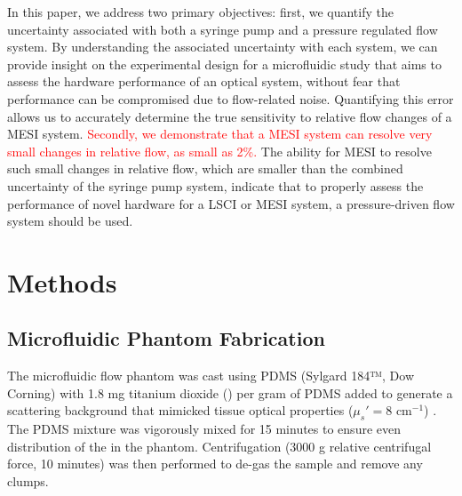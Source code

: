 \documentclass[12pt]{spieman}
\begin{document}
\begin{spacing}{2}
In this paper, we address two primary objectives: first, we quantify the uncertainty associated with both a syringe pump and a pressure regulated flow system. By understanding the associated uncertainty with each system, we can provide insight on the experimental design for a microfluidic study that aims to assess the hardware performance of an optical system, without fear that performance can be compromised due to flow-related noise. Quantifying this error allows us to accurately determine the true sensitivity to relative flow changes of a MESI system. \textcolor{red}{Secondly, we demonstrate that a MESI system can resolve very small changes in relative flow, as small as 2\%.} The ability for MESI to resolve such small changes in relative flow, which are smaller than the combined uncertainty of the syringe pump system, indicate that to properly assess the performance of novel hardware for a LSCI or MESI system, a pressure-driven flow system should be used.


\section{Methods}
\label{sect:methods}

\subsection{Microfluidic Phantom Fabrication}
The microfluidic flow phantom was cast using PDMS (Sylgard 184™, Dow Corning) with 1.8 mg titanium dioxide () per gram of PDMS added to generate a scattering background that mimicked tissue optical properties ($\mu_s' = 8$ cm$^{-1}$) \cite{Parthasarathy:2008el,Yaroslavsky:2002tg}. The PDMS  mixture was vigorously mixed for 15 minutes to ensure even distribution of the  in the phantom. Centrifugation (3000 g relative centrifugal force, 10 minutes) was then performed to de-gas the sample and remove any  clumps.


\end{spacing}
\end{document}
